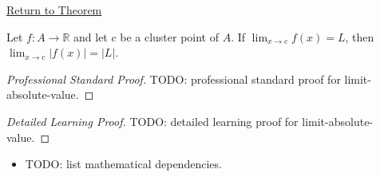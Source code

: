 \newpage
{}
\label{prf:limit-absolute-value}

\begin{remark*}[Return]
\hyperref[prop:limit-absolute-value]{Return to Theorem}
\end{remark*}

\begin{theorem*}
Let $f : A \to \mathbb{R}$ and let $c$ be a cluster point of $A$.
If $\lim_{x\to c}f(x)=L$, then
$\lim_{x\to c}|f(x)|=|L|$.

\smallskip\noindent
\end{theorem*}

\begin{proof}[Professional Standard Proof]
\LRAProofBodyStart
TODO: professional standard proof for limit-absolute-value.
\end{proof}

\begin{proof}[Detailed Learning Proof]
\LRAProofBodyStart
TODO: detailed learning proof for limit-absolute-value.
\end{proof}

\begin{remark*}
\end{remark*}

\begin{dependencies}
\begin{itemize}
  \item TODO: list mathematical dependencies.
\end{itemize}
\end{dependencies}

\clearpage
